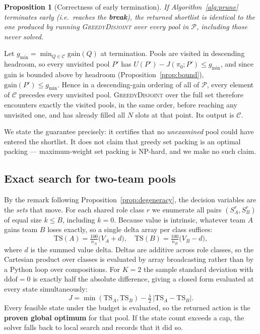 \documentclass[conference]{IEEEtran}
\newtheorem{proposition}{Proposition}
\begin{document}
\begin{proposition}[Correctness of early termination]\label{prop:pruning}
If Algorithm~\ref{alg:prune} terminates early (i.e.\ reaches the
\textbf{break}), the returned shortlist is
identical to the one produced by running \textsc{GreedyDisjoint} over
\emph{every} pool in $\mathcal{P}$, including those never solved.
\end{proposition}

\begin{IEEEproof}
Let $g_{\min}=\min_{Q\in\mathcal{C}}\mathrm{gain}(Q)$ at termination. Pools are
visited in descending headroom, so every unvisited pool $P'$ has
$U(P')-J(\pi_0;P')\le g_{\min}$, and since gain is bounded above by headroom
(Proposition~\ref{prop:bound}), $\mathrm{gain}(P')\le g_{\min}$. Hence in a
descending-gain ordering of all of $\mathcal{P}$, every element of $\mathcal{C}$
precedes every unvisited pool. \textsc{GreedyDisjoint} over the full set therefore
encounters exactly the visited pools, in the same order, before reaching any
unvisited one, and has already filled all $N$ slots at that point. Its output is
$\mathcal{C}$.
\end{IEEEproof}

We state the guarantee precisely: it certifies that no \emph{unexamined} pool
could have entered the shortlist. It does not claim that greedy set packing is an
optimal packing --- maximum-weight set packing is NP-hard, and we make no such
claim.

\subsection{Exact search for two-team pools}\label{sec:search}
By the remark following Proposition~\ref{prop:degeneracy}, the decision variables
are the \emph{sets} that move. For each shared role class $r$ we enumerate all
pairs $(S_A^r, S_B^r)$ of equal size $k\le B$, including $k=0$. Because value is
intrinsic, whatever team $A$ gains team $B$ loses exactly, so a single delta array
per class suffices:
\begin{equation}
\mathrm{TS}(A) = \tfrac{100}{n_A}\big(V_A + d\big),\quad
\mathrm{TS}(B) = \tfrac{100}{n_B}\big(V_B - d\big),
\end{equation}
where $d$ is the summed value delta. Deltas are additive across role classes, so
the Cartesian product over classes is evaluated by array broadcasting rather than
by a Python loop over compositions. For $K=2$ the sample standard deviation with
$\mathrm{ddof}=0$ is exactly half the absolute difference, giving a closed form
evaluated at every state simultaneously:
\begin{equation}
J = \min(\mathrm{TS}_A,\mathrm{TS}_B)-\tfrac{\lambda}{2}\,\big|\mathrm{TS}_A-\mathrm{TS}_B\big|.
\end{equation}
Every feasible state under the budget is evaluated, so the returned action is the
\textbf{proven global optimum} for that pool. If the state count exceeds a cap,
the solver falls back to local search and records that it did so.
\end{document}
